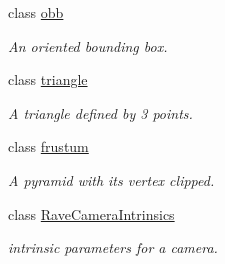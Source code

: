 \begin{DoxyCompactItemize}
class \hyperlink{classOpenRAVE_1_1geometry_1_1obb}{obb}
\begin{DoxyCompactList}\small\item\em An oriented bounding box. \item\end{DoxyCompactList}\item 
class \hyperlink{classOpenRAVE_1_1geometry_1_1triangle}{triangle}
\begin{DoxyCompactList}\small\item\em A triangle defined by 3 points. \item\end{DoxyCompactList}\item 
class \hyperlink{classOpenRAVE_1_1geometry_1_1frustum}{frustum}
\begin{DoxyCompactList}\small\item\em A pyramid with its vertex clipped. \item\end{DoxyCompactList}\item 
class \hyperlink{classOpenRAVE_1_1geometry_1_1RaveCameraIntrinsics}{RaveCameraIntrinsics}
\begin{DoxyCompactList}\small\item\em intrinsic parameters for a camera. \item\end{DoxyCompactList}\end{DoxyCompactItemize}
